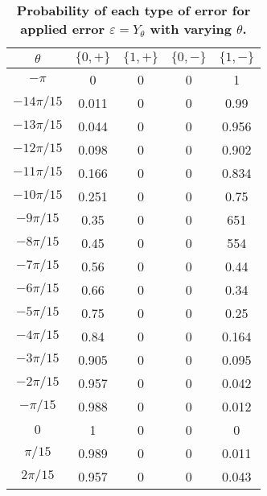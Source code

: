 \documentclass[superscriptaddress,twocolumn,showpacs,prb]{revtex4-1}
\begin{document}
\begin{table}[h!]
\begin{center}
 \begin{tabular}{c c c c c} 
 \hline
 \hline
 $\theta$ & $\{0 , +\}$ & $\{1 , +\}$&$\{0 , -\}$&$\{1 , -\}$ \\ [0.5ex] 
 \hline
 \hline
 $-\pi$ &0 &0 &0&1   \\ 
 \hline
 $-14\pi/15$ &0.011 &0&0&0.99  \\
 \hline
 $-13\pi/15$ & 0.044&0&0&0.956\\
 \hline
 $-12\pi/15$ & 0.098&0&0&0.902   \\  
\hline
 $-11\pi/15$ & 0.166&0&0&0.834   \\ 
 \hline
 $-10\pi/15$ & 0.251&0&0&0.75 \\
 \hline
  $-9\pi/15$&0.35&0&0&651\\
  \hline
  $-8\pi/15$&0.45&0&0&554\\
  \hline
  $-7\pi/15$&0.56&0&0&0.44\\
  \hline
  $-6\pi/15$&0.66&0&0&0.34\\
  \hline
  $-5\pi/15$&0.75&0&0&0.25\\
  \hline
 $-4\pi/15$&0.84&0&0&0.164\\
  \hline
  $-3\pi/15$&0.905&0&0&0.095\\
  \hline
  $-2\pi/15$&0.957&0&0&0.042\\
  \hline
  $-\pi/15$&0.988&0&0&0.012\\
  \hline
  $0$&1&0&0&0\\
  \hline
  $\pi/15$&0.989&0&0&0.011\\
  \hline
 $2\pi/15$&0.957&0&0&0.043\\
  [1ex] 
 \hline
 \hline
\end{tabular}
\caption{\textbf{Probability of each type of error for applied error $\varepsilon=Y_{\theta}$ with varying $\theta$.}}
\label{qed_table4}
\end{center}
\end{table}
\end{document}
